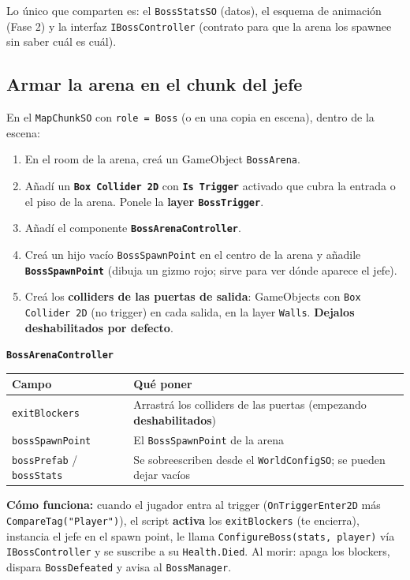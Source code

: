 \documentclass[a4paper,12pt]{article}
\newcommand{\code}[1]{\texttt{#1}}
\begin{document}
Lo único que comparten es: el \code{BossStatsSO} (datos), el esquema de animación (Fase 2) y la
interfaz \code{IBossController} (contrato para que la arena los spawnee sin saber cuál es cuál).

\subsection{Armar la arena en el chunk del jefe}

En el \code{MapChunkSO} con \code{role = Boss} (o en una copia en escena), dentro de la escena:

\begin{enumerate}
    \item En el room de la arena, creá un GameObject \code{BossArena}.
    \item Añadí un \textbf{\code{Box Collider 2D}} con \textbf{\code{Is Trigger}} activado que
    cubra la entrada o el piso de la arena. Ponele la \textbf{layer \code{BossTrigger}}.
    \item Añadí el componente \textbf{\code{BossArenaController}}.
    \item Creá un hijo vacío \code{BossSpawnPoint} en el centro de la arena y añadile
    \textbf{\code{BossSpawnPoint}} (dibuja un gizmo rojo; sirve para ver dónde aparece el jefe).
    \item Creá los \textbf{colliders de las puertas de salida}: GameObjects con
    \code{Box Collider 2D} (no trigger) en cada salida, en la layer \code{Walls}.
    \textbf{Dejalos deshabilitados por defecto}.
\end{enumerate}

\textbf{\code{BossArenaController}}

\begin{center}
\begin{tabular}{|l|p{8.4cm}|}
\hline
\textbf{Campo} & \textbf{Qué poner} \\
\hline
\code{exitBlockers} & Arrastrá los colliders de las puertas (empezando \textbf{deshabilitados}) \\
\hline
\code{bossSpawnPoint} & El \code{BossSpawnPoint} de la arena \\
\hline
\code{bossPrefab} / \code{bossStats} & Se sobreescriben desde el \code{WorldConfigSO}; se pueden dejar vacíos \\
\hline
\end{tabular}
\end{center}

\textbf{Cómo funciona:} cuando el jugador entra al trigger (\code{OnTriggerEnter2D} más
\code{CompareTag("Player")}), el script \textbf{activa} los \code{exitBlockers} (te encierra),
instancia el jefe en el spawn point, le llama \code{ConfigureBoss(stats, player)} vía
\code{IBossController} y se suscribe a su \code{Health.Died}. Al morir: apaga los blockers, dispara
\code{BossDefeated} y avisa al \code{BossManager}.
\end{document}
